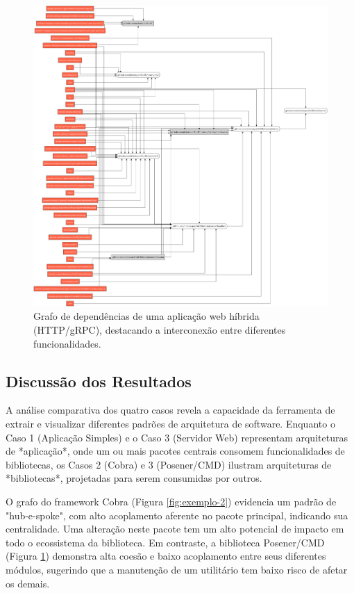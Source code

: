 \documentclass[12pt]{article}
\begin{document}
\begin{figure}[htbp]
\centering
\includegraphics[width=1\textwidth]{examples/gode.png}
\caption{Grafo de dependências de uma aplicação web híbrida (HTTP/gRPC), destacando a interconexão entre diferentes funcionalidades.}
\label{fig:exemplo-3}
\end{figure}

\FloatBarrier 

\subsection{Discussão dos Resultados}
A análise comparativa dos quatro casos revela a capacidade da ferramenta de extrair e visualizar diferentes padrões de arquitetura de software. Enquanto o Caso 1 (Aplicação Simples) e o Caso 3 (Servidor Web) representam arquiteturas de *aplicação*, onde um ou mais pacotes centrais consomem funcionalidades de bibliotecas, os Casos 2 (Cobra) e 3 (Posener/CMD) ilustram arquiteturas de *bibliotecas*, projetadas para serem consumidas por outros.

O grafo do framework Cobra (Figura \ref{fig:exemplo-2}) evidencia um padrão de "hub-e-spoke", com alto acoplamento aferente no pacote principal, indicando sua centralidade. Uma alteração neste pacote tem um alto potencial de impacto em todo o ecossistema da biblioteca. Em contraste, a biblioteca Posener/CMD (Figura \ref{fig:exemplo-3}) demonstra alta coesão e baixo acoplamento entre seus diferentes módulos, sugerindo que a manutenção de um utilitário tem baixo risco de afetar os demais.
\end{document}
